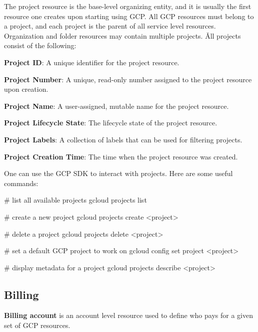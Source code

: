 The project resource is the base-level organizing entity, and it is usually the first resource one creates upon starting
using GCP. All GCP resources must belong to a project, and each project is the parent of all service level resources.
Organization and folder resources may contain multiple projects. \v

All projects consist of the following:
\bit
\item \textbf{Project ID}: A unique identifier for the project resource.
\item \textbf{Project Number}: A unique, read-only number assigned to the project resource upon creation.
\item \textbf{Project Name}: A user-assigned, mutable name for the project resource.
\item \textbf{Project Lifecycle State}: The lifecycle state of the project resource.
\item \textbf{Project Labels}: A collection of labels that can be used for filtering projects.
\item \textbf{Project Creation Time}: The time when the project resource was created.
\eit


One can use the GCP SDK to interact with projects. Here are some useful commands:
\begin{bash}
# list all available projects
gcloud projects list
\end{bash}

\begin{bash}
# create a new project
gcloud projects create <project>
\end{bash}

\begin{bash}
# delete a project
gcloud projects delete <project>
\end{bash}

\begin{bash}
# set a default GCP project to work on
gcloud config set project <project>
\end{bash}

\begin{bash}
# display metadata for a project
gcloud projects describe <project>
\end{bash}

\subsection{Billing}

\textbf{Billing account} is an account level resource used to define who pays for a given set of GCP resources.
\ed

